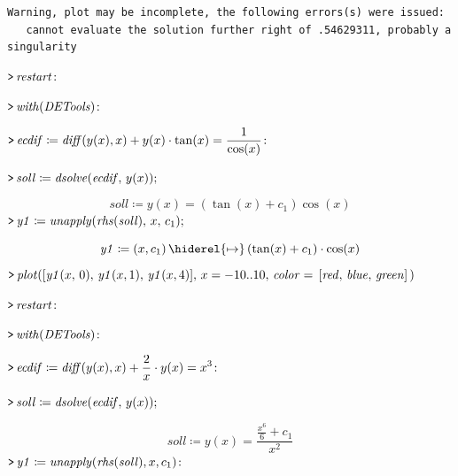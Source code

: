 \documentclass{article}
\begin{document}
\begin{lstlisting}
Warning, plot may be incomplete, the following errors(s) were issued:
   cannot evaluate the solution further right of .54629311, probably a singularity
\end{lstlisting}
{}
\mapleinput
{$ \displaystyle \texttt{>\,} \mathit{restart} \colon  $}

\mapleinput
{$ \displaystyle \texttt{>\,} \mathit{with} (\mathit{DETools})\colon  $}

\mapleinput
{$ \displaystyle \texttt{>\,} \mathit{ecdif} \coloneqq \mathit{diff} (y (x),x)+y (x)\cdot \tan (x)=\frac{1}{\cos (x)}\colon  $}

\mapleinput
{$ \displaystyle \texttt{>\,} \mathit{soll} \coloneqq \mathit{dsolve} (\mathit{ecdif} ,\,y (x)); $}

\begin{dmath}\label{(13)}
\mathit{soll} \coloneqq y \! \left(x \right)=\left(\tan \! \left(x \right)+c_{1}\right) \cos \! \left(x \right)
\end{dmath}
\mapleinput
{$ \displaystyle \texttt{>\,} \mathit{y1} \coloneqq \mathit{unapply} (\mathit{rhs} (\mathit{soll}),\,x ,\,c_{1}); $}

\begin{dmath}\label{(14)}
\mathit{y1} \coloneqq \left(x ,c_{1}\right)\hiderel{\mapsto }\left(\tan \! \left(x \right)+c_{1}\right)\cdot \cos \! \left(x \right)
\end{dmath}
\mapleinput
{$ \displaystyle \texttt{>\,} \mathit{plot} ([\mathit{y1} (x ,\,0),\,\mathit{y1} (x ,1),\,\mathit{y1} (x ,4)],\,x =-10..10,\,\mathit{color} =\,[\mathit{red} ,\,\mathit{blue} ,\,\mathit{green}]\,) $}

{}
\mapleinput
{$ \displaystyle \texttt{>\,} \mathit{restart} \colon  $}

\mapleinput
{$ \displaystyle \texttt{>\,} \mathit{with} (\mathit{DETools})\colon  $}

\mapleinput
{$ \displaystyle \texttt{>\,} \mathit{ecdif} \coloneqq \mathit{diff} (y (x),x)+\frac{2}{x}\cdot y (x)=x^{3}\colon  $}

\mapleinput
{$ \displaystyle \texttt{>\,} \mathit{soll} \coloneqq \mathit{dsolve} (\mathit{ecdif} ,\,y (x)); $}

\begin{dmath}\label{(15)}
\mathit{soll} \coloneqq y \! \left(x \right)=\frac{\frac{x^{6}}{6}+c_{1}}{x^{2}}
\end{dmath}
\mapleinput
{$ \displaystyle \texttt{>\,} \mathit{y1} \coloneqq \mathit{unapply} (\mathit{rhs} (\mathit{soll}),x ,c_{1})\colon  $}
\end{document}
